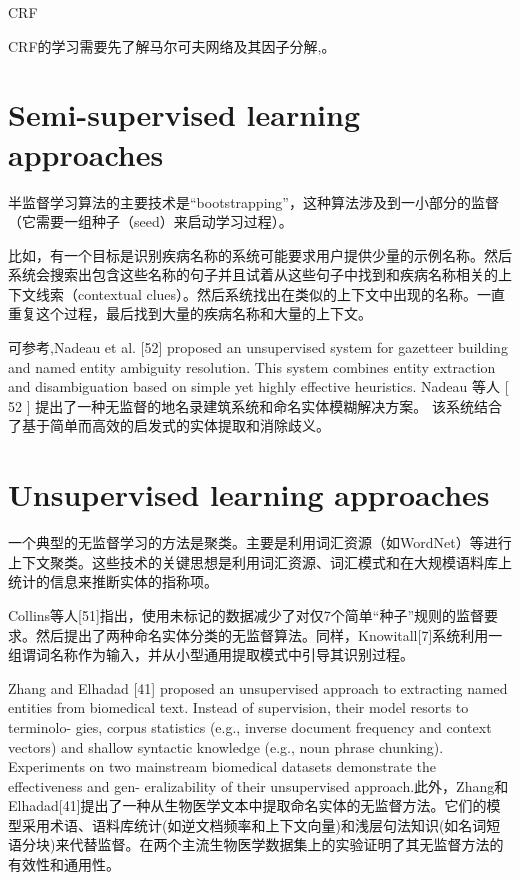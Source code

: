 \documentclass[a4paper,UTF8,no-math]{ctexart}
\begin{document}
	CRF\citep{lafferty2001conditional}
	
	CRF的学习需要先了解马尔可夫网络及其因子分解\citep{李航2012统计学习方法},\citep{noauthor__nodate}。
	
	
	
	\newpage
	
	\section{Semi-supervised learning approaches}
	
	半监督学习算法的主要技术是“bootstrapping”，这种算法涉及到一小部分的监督（它需要一组种子（seed）来启动学习过程）。
	
	比如，有一个目标是识别疾病名称的系统可能要求用户提供少量的示例名称。然后系统会搜索出包含这些名称的句子并且试着从这些句子中找到和疾病名称相关的上下文线索（contextual clues）。然后系统找出在类似的上下文中出现的名称。一直重复这个过程，最后找到大量的疾病名称和大量的上下文。
	
	可参考\citep{nadeau2006unsupervised},Nadeau et al. [52] proposed an unsupervised system for
	gazetteer building and named entity ambiguity resolution.
	This system combines entity extraction and disambiguation
	based on simple yet highly effective heuristics.
	Nadeau 等人 [ 52 ] 提出了一种无监督的地名录建筑系统和命名实体模糊解决方案。 该系统结合了基于简单而高效的启发式的实体提取和消除歧义。
	
	
	
	\section{Unsupervised learning approaches}
	
	一个典型的无监督学习的方法是聚类。主要是利用词汇资源（如WordNet）等进行上下文聚类。这些技术的关键思想是利用词汇资源、词汇模式和在大规模语料库上统计的信息来推断实体的指称项。
	
	Collins等人[51]指出，使用未标记的数据减少了对仅7个简单“种子”规则的监督要求。然后提出了两种命名实体分类的无监督算法。同样，Knowitall[7]系统利用一组谓词名称作为输入，并从小型通用提取模式中引导其识别过程。 
	
	 Zhang and Elhadad [41] proposed an unsupervised
	approach to extracting named entities from biomedical text.
	Instead of supervision, their model resorts to terminolo-
	gies, corpus statistics (e.g., inverse document frequency
	and context vectors) and shallow syntactic knowledge (e.g.,
	noun phrase chunking). Experiments on two mainstream
	biomedical datasets demonstrate the effectiveness and gen-
	eralizability of their unsupervised approach.此外，Zhang和Elhadad[41]提出了一种从生物医学文本中提取命名实体的无监督方法。它们的模型采用术语、语料库统计(如逆文档频率和上下文向量)和浅层句法知识(如名词短语分块)来代替监督。在两个主流生物医学数据集上的实验证明了其无监督方法的有效性和通用性。 
	
\end{document}
